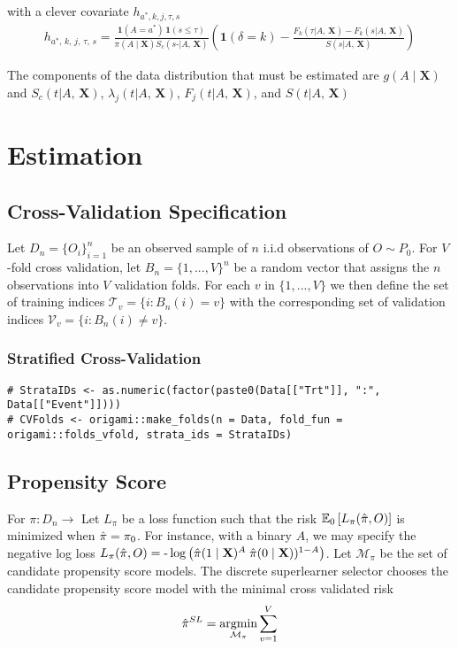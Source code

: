 \documentclass{article}
\newcommand{\1}{\ensuremath{\mathbf{1}}}
\DeclareMathOperator*{\argmin}{argmin}
\newcommand{\X}{\ensuremath{\mathbf{X}}}
\newcommand{\AX}{\ensuremath{\mid A,\,\mathbf{X}}}
\newcommand{\trt}{\ensuremath{a^*}}
\newcommand{\tk}{\ensuremath{\tau}}
\newcommand{\jj}{\ensuremath{k}}
\newcommand{\g}{\ensuremath{\pi}}
\begin{document}
with a clever covariate  $h_{\trt, \jj, j, \tk, s}$ 
\begin{align*}
    h_{\trt,\, \jj,\, j,\, \tk,\, s} = \frac{\1(A = \trt)\, \1(s \leq \tk)}{\g(A \mid \X) S_c(s\text{-} \AX)} \left(\1(\delta = \jj) - \frac{F_\jj(\tk \AX) - F_\jj(s \AX)}{S(s \AX)}\right)
\end{align*}

The components of the data distribution that must be estimated are $g(A \mid \X)$ and $S_c(t \AX)$, $\lambda_j(t \AX)$, $F_j(t \AX)$, and $S(t \AX)$

\section{Estimation}
\subsection{Cross-Validation Specification}
Let $D_n = \{O_i\}_{i=1}^n$ be an observed sample of $n$ i.i.d observations of $O \sim P_0$. For $V$-fold cross validation, let $B_n = \{1, ... , V\}^n$ be a random vector that assigns the $n$ observations into $V$ validation folds. For each $v$ in $\{1, ..., V\}$ we then define the set of training indices $\mathcal{T}_v = \{i : B_n(i) = v\}$ with the corresponding set of validation indices $\mathcal{V}_v = \{i : B_n(i) \neq v\}$.

\subsubsection{Stratified Cross-Validation}

\begin{lstlisting}
# StrataIDs <- as.numeric(factor(paste0(Data[["Trt"]], ":", Data[["Event"]])))
# CVFolds <- origami::make_folds(n = Data, fold_fun = origami::folds_vfold, strata_ids = StrataIDs)
\end{lstlisting}

\subsection{Propensity Score}
For $\pi : D_n \to  $ Let $L_\pi$ be a loss function such that the risk $\mathbb{E}_0\left[L_\pi(\Hat{\pi}, O)\right]$ is minimized when $\Hat{\pi} = \pi_0$. For instance, with a binary $A$, we may specify the negative log loss $L_\pi(\Hat{\pi}, O) = \text{-}\log\left(\Hat{\pi}(1 \mid \X)^A \; \Hat{\pi}(0 \mid \X))^{1-A}\right)$. Let $\mathcal{M_\pi}$ be the set of candidate propensity score models. The discrete superlearner selector chooses the candidate propensity score model with the minimal cross validated risk 
\[ \Hat{\pi}^{SL} = \argmin_{\mathcal{M}_\pi} \sum_{v = 1}^{V} \]
\end{document}
